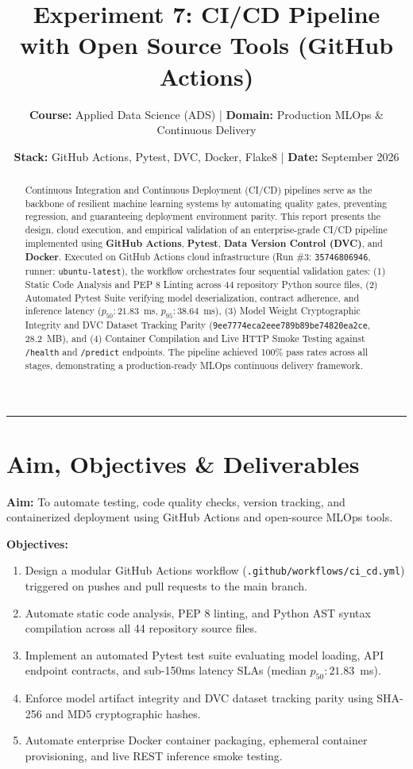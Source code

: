 \documentclass[11pt, a4paper]{article}
\title{\textbf{Experiment 7: CI/CD Pipeline with Open Source Tools (GitHub Actions)}}
\author{\textbf{Course:} Applied Data Science (ADS) \quad | \quad \textbf{Domain:} Production MLOps \& Continuous Delivery}
\date{\textbf{Stack:} GitHub Actions, Pytest, DVC, Docker, Flake8 \quad | \quad \textbf{Date:} September 2026}
\begin{document}
\maketitle

\begin{abstract}
Continuous Integration and Continuous Deployment (CI/CD) pipelines serve as the backbone of resilient machine learning systems by automating quality gates, preventing regression, and guaranteeing deployment environment parity. This report presents the design, cloud execution, and empirical validation of an enterprise-grade CI/CD pipeline implemented using \textbf{GitHub Actions}, \textbf{Pytest}, \textbf{Data Version Control (DVC)}, and \textbf{Docker}. Executed on GitHub Actions cloud infrastructure (Run \#3: \texttt{35746806946}, runner: \texttt{ubuntu-latest}), the workflow orchestrates four sequential validation gates: (1) Static Code Analysis and PEP 8 Linting across 44 repository Python source files, (2) Automated Pytest Suite verifying model deserialization, contract adherence, and inference latency ($p_{50}: 21.83$~ms, $p_{95}: 38.64$~ms), (3) Model Weight Cryptographic Integrity and DVC Dataset Tracking Parity (\texttt{9ee7774eca2eee789b89be74820ea2ce}, 28.2~MB), and (4) Container Compilation and Live HTTP Smoke Testing against \texttt{/health} and \texttt{/predict} endpoints. The pipeline achieved 100\% pass rates across all stages, demonstrating a production-ready MLOps continuous delivery framework.
\end{abstract}

\vspace{0.2em}
\hrule
\vspace{0.6em}

\section{Aim, Objectives \& Deliverables}
\textbf{Aim:} To automate testing, code quality checks, version tracking, and containerized deployment using GitHub Actions and open-source MLOps tools.

\noindent \textbf{Objectives:}
\begin{enumerate}[leftmargin=2em]
    \item Design a modular GitHub Actions workflow (\texttt{.github/workflows/ci\_cd.yml}) triggered on pushes and pull requests to the main branch.
    \item Automate static code analysis, PEP 8 linting, and Python AST syntax compilation across all 44 repository source files.
    \item Implement an automated Pytest test suite evaluating model loading, API endpoint contracts, and sub-150ms latency SLAs (median $p_{50}: 21.83$~ms).
    \item Enforce model artifact integrity and DVC dataset tracking parity using SHA-256 and MD5 cryptographic hashes.
    \item Automate enterprise Docker container packaging, ephemeral container provisioning, and live REST inference smoke testing.
\end{enumerate}
\end{document}
